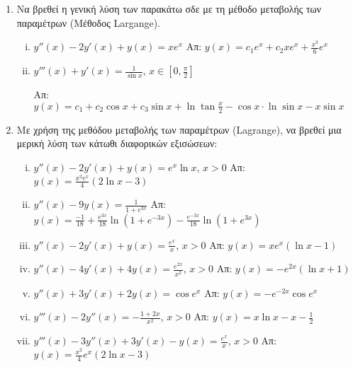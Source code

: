 \begin{enumerate}
  \item Να βρεθεί η γενική λύση των παρακάτω σδε με τη μέθοδο μεταβολής των 
    παραμέτρων (Μέθοδος Largange).
    \begin{enumerate}[i)]
      \item $y''(x)-2y'(x)+y(x)=xe^{x}$ 
        \hfill Απ: $y(x)=c_{1}e^{x}+c_{2}xe^{x}+\frac{x^{3}}{6}e^{x}$
      \item $y'''(x)+y'(x)=\frac{1}{\sin x}$, $x\in [0,\frac{\pi}{2}]$

        \hfill Απ: $y(x)=c_{1}+c_2\cos x+c_3 \sin x+\ln \tan \frac{x}{2}-
        \cos x\cdot\ln\sin x-x\sin x$
    \end{enumerate}

  \item Με χρήση της μεθόδου μεταβολής των παραμέτρων (Lagrange), να βρεθεί 
    μια μερική λύση των κάτωθι διαφορικών εξισώσεων:
    \begin{enumerate}[i)]
      \item $y''(x)-2y'(x)+y(x)=e^{x}\ln x$, $x>0$ 
        \hfill Απ: $y(x)=\frac{x^{2}e^{x}}{4}(2\ln x-3)$
      \item $y''(x)-9y(x)=\frac{1}{1+e^{3x}}$ 
        \hfill Απ: $y(x)=\frac{-1}{18}+\frac{e^{3x}}{18}\ln (1+e^{-3x})-
        \frac{e^{-3x}}{18}\ln(1+e^{3x})$
      \item $y''(x)-2y'(x)+y(x)=\frac{e^x}{x}$, $x>0$ \hfill Απ: $y(x)=xe^{x}(\ln x-1)$
      \item $y''(x)-4y'(x)+4y(x)=\frac{e^{2x}}{x^{2}}$, $x>0$ 
        \hfill Απ: $y(x)=-e^{2x}(\ln x +1)$
      \item $y''(x)+3y'(x)+2y(x)=\cos e^{x}$ \hfill Απ: $y(x)=-e^{-2x}\cos e^{x}$
      \item $y'''(x)-2y''(x)=-\frac{1+2x}{x^{2}}$, $x>0$ 
        \hfill Απ: $y(x)=x\ln x-x -\frac{1}{2}$
      \item $y'''(x)-3y''(x)+3y'(x)-y(x)=\frac{e^{x}}{x}$, $x>0$ 
        \hfill Απ: $y(x)=\frac{x^{2}}{4}e^{x}(2\ln x-3)$
    \end{enumerate}


\end{enumerate}
